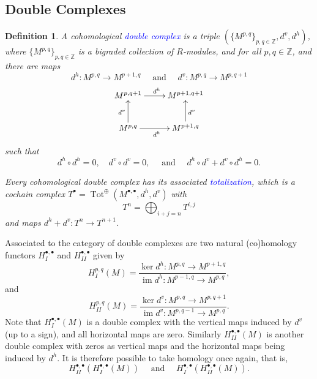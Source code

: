 \documentclass[11pt]{article}
\theoremstyle{thmstyle}
\theoremstyle{defstyle}
\newtheorem{definition}[theorem]{Definition}
\newcommand{\Z}{\mathbb{Z}}
\newcommand{\im}{\operatorname{im}}
\newcommand{\define}[1]{\textcolor{blue}{\textit{#1}}}
\begin{document}
\subsection*{Double Complexes}

\begin{definition}
    A cohomological \define{double complex} is a triple $(\{M^{p, q}\}_{p, q\in\Z}, d^v, d^h)$, where $\{M^{p, q}\}_{p, q\in\Z}$ is a bigraded collection of $R$-modules, and for all $p, q\in\Z$, and there are maps 
    \begin{equation*}
        d^h\colon M^{p, q}\to M^{p + 1, q}\quad\text{ and }\quad d^v\colon M^{p, q}\to M^{p, q + 1}
    \end{equation*}
    \begin{equation*}
        \xymatrix {
            M^{p, q + 1}\ar[r]^{d^h} & M^{p + 1, q + 1}\\
            M^{p, q}\ar[r]_{d^h}\ar[u]^{d^v} & M^{p + 1, q}\ar[u]_{d^v}
        }
    \end{equation*}
    such that 
    \begin{equation*}
        d^h\circ d^h = 0,\quad d^v\circ d^v = 0,\quad\text{ and }\quad d^h\circ d^v + d^v\circ d^h = 0.
    \end{equation*}

    Every cohomological double complex has its associated \define{totalization}, which is a cochain complex $T^\bullet = \operatorname{Tot}^{\oplus}(M^{\bullet,\bullet}, d^h, d^v)$ with 
    \begin{equation*}
        T^n = \bigoplus_{i + j = n} T^{i, j}
    \end{equation*}
    and maps $d^h + d^v\colon T^n\to T^{n + 1}$.
\end{definition}

Associated to the category of double complexes are two natural (co)homology functors $H^{\bullet, \bullet}_I$ and $H^{\bullet, \bullet}_{II}$ given by
\begin{equation*}
    H^{p, q}_I(M) = \frac{\ker d^h\colon M^{p, q}\to M^{p + 1, q}}{\im d^h\colon M^{p - 1, q}\to M^{p, q}},
\end{equation*}
and 
\begin{equation*}
    H^{p, q}_{II}(M) = \frac{\ker d^v\colon M^{p, q}\to M^{p, q + 1}}{\im d^v\colon M^{p, q - 1}\to M^{p, q}}.
\end{equation*}
Note that $H^{\bullet,\bullet}_I(M)$ is a double complex with the vertical maps induced by $d^v$ (up to a sign), and all horizontal maps are zero. Similarly $H^{\bullet, \bullet}_{II}(M)$ is another double complex with zeros as vertical maps and the horizontal maps being induced by $d^h$. It is therefore possible to take homology once again, that is, 
\begin{equation*}
    H^{\bullet, \bullet}_{II}\left(H^{\bullet, \bullet}_{I}(M)\right)\quad\text{ and }\quad H^{\bullet, \bullet}_{I}\left(H^{\bullet, \bullet}_{II}(M)\right).
\end{equation*}
\end{document}
